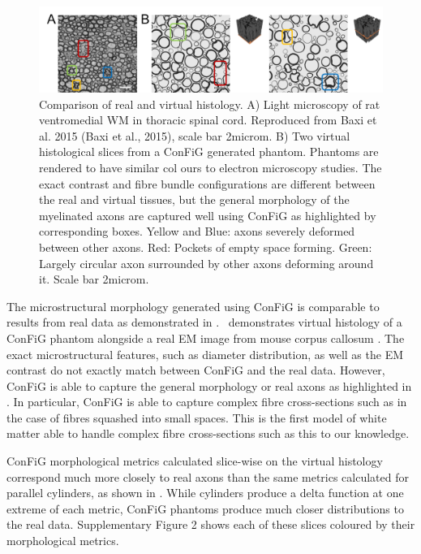 \begin{figure}
  \centering
  \includegraphics[width=\textwidth]{figures/config/virthist1_wbox_whitebg.png}
  \caption[Comparison of real and virtual histology]{Comparison of real  and virtual histology. A) Light microscopy of rat ventromedial WM in thoracic spinal cord. Reproduced from Baxi et al. 2015 (Baxi et al., 2015), scale bar 2microm. B) Two virtual histological slices from a ConFiG generated phantom. Phantoms are rendered to have similar col ours to electron microscopy studies. The exact contrast and fibre bundle configurations are different between the real and virtual tissues, but the general morphology of the myelinated axons are captured well using ConFiG as highlighted by corresponding boxes. Yellow and Blue: axons severely deformed between other axons. Red: Pockets of empty space forming. Green: Largely circular axon surrounded by other axons deforming around it. Scale bar 2microm.}
  \label{fig:config_res_real_vs_virt_hist}
\end{figure}

The microstructural morphology generated using ConFiG is comparable to results from real data as demonstrated in .~ demonstrates virtual histology of a ConFiG phantom alongside a real EM image from mouse corpus callosum \cite{Baxi2015}. The exact microstructural features, such as diameter distribution, as well as the EM contrast do not exactly match between ConFiG and the real data. However, ConFiG is able to capture the general morphology or real axons as highlighted in . In particular, ConFiG is able to capture complex fibre cross-sections such as in the case of fibres squashed into small spaces. This is the first model of white matter able to handle complex fibre cross-sections such as this to our knowledge.

ConFiG morphological metrics calculated slice-wise on the virtual histology correspond much more closely to real axons than the same metrics calculated for parallel cylinders, as shown in . While cylinders produce a delta function at one extreme of each metric, ConFiG phantoms produce much closer distributions to the real data. Supplementary Figure 2 shows each of these slices coloured by their morphological metrics.

